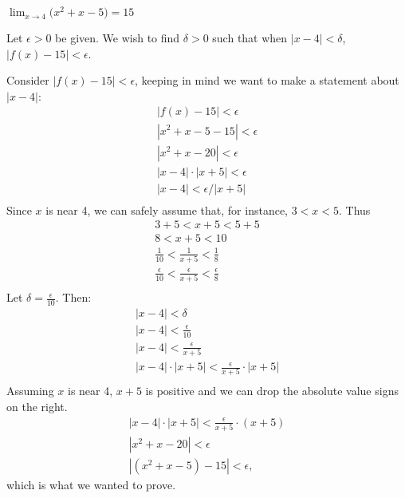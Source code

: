 {$\displaystyle \lim_{x\to 4} \big(x^2+x-5\big) = 15$}
{Let $\epsilon >0$ be given. We wish to find $\delta >0$ such that when $|x-4|<\delta$, $|f(x)-15|<\epsilon$. 

Consider $|f(x)-15|<\epsilon$, keeping in  mind we want to make a statement about $|x-4|$:
\begin{gather*}
|f(x) -15 | < \epsilon \\
|x^2+x-5 -15 |<\epsilon \\
| x^2+x-20 | < \epsilon \\
| x-4 |\cdot|x+5| < \epsilon \\
| x-4 | < \epsilon/|x+5| \\
\end{gather*}
Since $x$ is near 4, we can safely assume that, for instance, $3<x<5$. Thus
\begin{gather*}
3+5<x+5<5+5 \\
8 < x+5 < 10 \\
\frac{1}{10} < \frac{1}{x+5} < \frac{1}{8} \\
\frac{\epsilon}{10} < \frac{\epsilon}{x+5} < \frac{\epsilon}{8} \\
\end{gather*}
Let $\delta =\frac{\epsilon}{10}$. Then:
\begin{gather*}
|x-4|<\delta \\
|x-4| < \frac{\epsilon}{10}\\
|x-4| < \frac{\epsilon}{x+5}\\
|x-4|\cdot|x+5| < \frac{\epsilon}{x+5}\cdot|x+5|\\
\end{gather*}
Assuming $x$ is near 4, $x+5$ is positive and we can drop the absolute value signs on the right.
\begin{gather*}
|x-4|\cdot|x+5| < \frac{\epsilon}{x+5}\cdot(x+5)\\
|x^2+x-20| < \epsilon\\
|(x^2+x-5) -15| < \epsilon,
\end{gather*}
which is what we wanted to prove.
}


